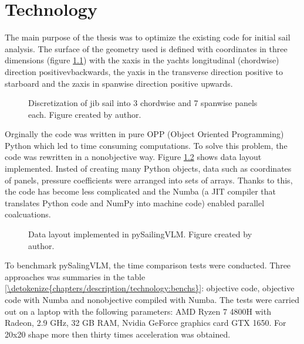\documentclass[letterpaper,10pt,english]{jupyterBook}
\let\sphinxpxdimen\pdfpxdimen\else\newdimen\sphinxpxdimen
\begin{document}
\sphinxstepscope


\chapter{Technology}
\label{\detokenize{chapters/description/technology:technology}}\label{\detokenize{chapters/description/technology::doc}}
\sphinxAtStartPar
The main purpose of the thesis was to optimize the existing code for initial sail analysis. The surface of the geometry used is defined with coordinates in three dimensions (figure \hyperref[\detokenize{chapters/description/technology:geom}]{\ref{\detokenize{chapters/description/technology:geom}}})  with the x\sphinxhyphen{}axis in the yachts longitudinal (chordwise) direction positivevbackwards, the y\sphinxhyphen{}axis in the transverse direction positive to starboard and the z\sphinxhyphen{}axis in spanwise direction positive upwards.

\begin{figure}[htbp]
\centering
\capstart

\noindent\sphinxincludegraphics[height=400\sphinxpxdimen]{{geom}.png}
\caption{Discretization of jib sail into 3 chordwise and 7 spanwise panels each. Figure created by author.}\label{\detokenize{chapters/description/technology:geom}}\end{figure}

\sphinxAtStartPar
Orginally the code was written in pure OPP (Object Oriented Programming) Python which led to time consuming computations. To solve this problem, the code was rewritten in a non\sphinxhyphen{}objective way. Figure \hyperref[\detokenize{chapters/description/technology:uklad}]{\ref{\detokenize{chapters/description/technology:uklad}}} shows data layout implemented. Insted of creating many Python objects, data such as coordinates of panels, pressure coefficients were arranged into sets of arrays. Thanks to this, the code has become less complicated and the  Numba (a JIT compiler that translates Python code and NumPy into machine code) enabled parallel coalcuations.

\begin{figure}[htbp]
\centering
\capstart

\noindent\sphinxincludegraphics[height=400\sphinxpxdimen]{{panele.drawio}.png}
\caption{Data layout implemented in pySailingVLM. Figure created by author.}\label{\detokenize{chapters/description/technology:uklad}}\end{figure}

\sphinxAtStartPar
To benchmark pySalingVLM, the time comparison tests were conducted. Three approaches was summaries in the table \hyperref[\detokenize{chapters/description/technology:benchs}]{\ref{\detokenize{chapters/description/technology:benchs}}}: objective code, objective code with Numba and non\sphinxhyphen{}objective compiled with Numba.  The tests were carried out on a laptop with the following parameters: AMD Ryzen 7 4800H with Radeon, 2.9 GHz, 32 GB RAM, Nvidia GeForce graphics card GTX 1650. For 20x20 shape more then thirty times acceleration was obtained.
\end{document}
